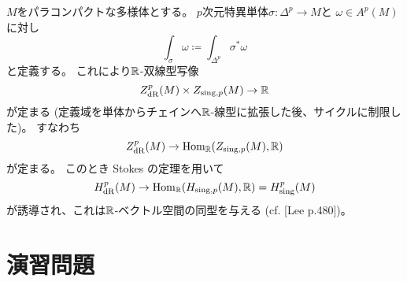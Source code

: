 \documentclass[report]{jlreq}
\begin{document}
\begin{remark}
    $M$をパラコンパクトな多様体とする。
    $p$次元{\smooth}特異単体$\sigma \colon \Delta^p \to M$と
    $\omega \in A^p(M)$に対し
    \begin{equation}
        \int_{\sigma} \omega \coloneqq \int_{\Delta^p} \sigma^* \omega
    \end{equation}
    と定義する。
    これにより$\mathbb{R}$-双線型写像
    \begin{equation}
        Z_{\mathrm{dR}}^p(M) \times Z_{\mathrm{sing}, p}(M) \to \mathbb{R}
    \end{equation}
    が定まる (定義域を単体からチェインへ$\mathbb{R}$-線型に拡張した後、サイクルに制限した)。
    すなわち
    \begin{equation}
        Z_{\mathrm{dR}}^p(M) \to \operatorname{Hom}_{\mathbb{R}}(Z_{\mathrm{sing}, p}(M), \mathbb{R})
    \end{equation}
    が定まる。
    このとき Stokes の定理を用いて
    \begin{equation}
        H_{\mathrm{dR}}^p(M)
            \to \operatorname{Hom}_{\mathbb{R}}(H_{\mathrm{sing}, p}(M), \mathbb{R})
            = H_{\mathrm{sing}}^p(M)
    \end{equation}
    が誘導され、これは$\mathbb{R}$-ベクトル空間の同型を与える (cf. [Lee p.480])。
\end{remark}





%
\newpage
\section{演習問題}

\end{document}

